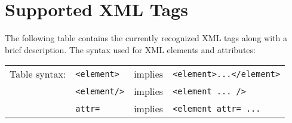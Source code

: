 %


\section{Supported XML Tags}
\label{sect:supported-xml-tags}

The following table contains the currently recognized XML tags along with a
brief description.  The syntax used for XML elements and attributes:
\begin{table}[h!]
\begin{footnotesize}
  \begin{tabular}{llcl} 
  Table syntax:  
  	& \verb|<element>|
	& implies
	& \verb|<element>...</element>| \\
	& \verb|<element/>|
	& implies
	& \verb|<element ... />| \\
  	& \hspace{3pt} \verb|attr=|
	& implies
	& \verb|<element attr= ...| 
  \end{tabular}
  \end{footnotesize}
\end{table}


